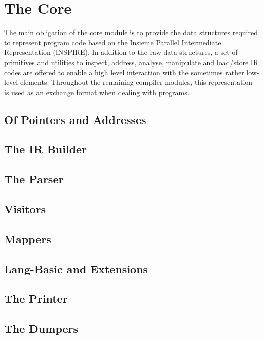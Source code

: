 \section{The Core}
The main obligation of the core module is to provide the data structures
required to represent program code based on the Insieme Parallel Intermediate
Representation (INSPIRE). In addition to the raw data structures, a set of
primitives and utilities to inspect, address, analyse, manipulate and load/store
IR codes are offered to enable a high level interaction with the sometimes rather
low-level elements. Throughout the remaining compiler modules, this
representation is used as an exchange format when dealing with programs.







\subsection{Of Pointers and Addresses}
\label{sec:Compiler.Core.PointersAndAddresses}

\subsection{The IR Builder}
\label{sec:Compiler.Core.Builder}
\subsection{The Parser}
\label{sec:Compiler.Core.Parser}
\subsection{Visitors}
\label{sec:Compiler.Core.Visitors}
\subsection{Mappers}
\label{sec:Compiler.Core.Mappers}
\subsection{Lang-Basic and Extensions}
\label{sec:Compiler.Core.LangBasic}
\subsection{The Printer}
\label{sec:Compiler.Core.Printer}
\subsection{The Dumpers}
\label{sec:Compiler.Core.Dumpers}
